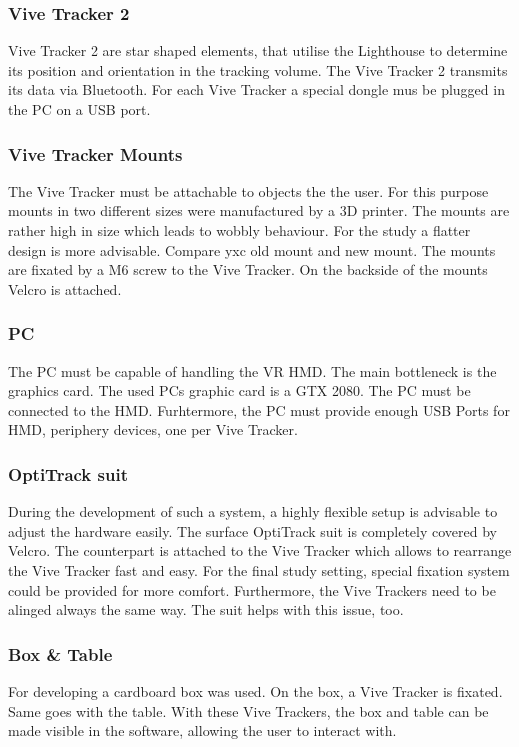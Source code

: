 \subsubsection{Vive Tracker 2}
Vive Tracker 2 are star shaped elements, that utilise the Lighthouse to determine its position and orientation in the tracking volume. The Vive Tracker 2 transmits its data via Bluetooth. For each Vive Tracker a special dongle mus be plugged in the PC on a USB port.
\subsubsection{Vive Tracker Mounts}
The Vive Tracker must be attachable to objects the the user. For this purpose mounts in two different sizes were manufactured by a 3D printer. The mounts are rather high in size which leads to wobbly behaviour. For the study a flatter design is more advisable. Compare yxc old mount and new mount. The mounts are fixated by a M6 screw to the Vive Tracker. On the backside of the mounts Velcro is attached.
\subsubsection{PC}
The PC must be capable of handling the VR HMD. The main bottleneck is the graphics card. The used PCs graphic card is a GTX 2080. The PC must be connected to the HMD. Furhtermore, the PC must provide enough USB Ports for HMD, periphery devices, one per Vive Tracker. %
\subsubsection{OptiTrack suit}
During the development of such a system, a highly flexible setup is advisable to adjust the hardware easily. The surface OptiTrack suit is completely covered by Velcro. The counterpart is attached to the Vive Tracker which allows to rearrange the Vive Tracker fast and easy. For the final study setting, special fixation system could be provided for more comfort. Furthermore, the Vive Trackers need to be alinged always the same way. The suit helps with this issue, too.
\subsubsection{Box \& Table}
For developing a cardboard box was used. On the box, a Vive Tracker is fixated. Same goes with the table. With these Vive Trackers, the box and table can be made visible in the software, allowing the user to interact with. %

